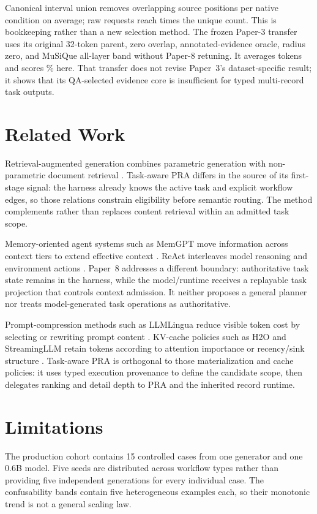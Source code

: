 \documentclass[10pt]{article}
\begin{document}
Canonical interval union removes \NativeBugMeanOverlapRemoved{} overlapping source positions per native condition on average; raw requests reach \NativeBugMaxDuplicationRatio{} times the unique count. This is bookkeeping rather than a new selection method. The frozen Paper-3 transfer uses its original 32-token parent, zero overlap, annotated-evidence oracle, radius zero, and MuSiQue all-layer band without Paper-8 retuning. It averages \NativeBugPaperThreeTokens{} tokens and scores \NativeBugPaperThreeAccuracy\% here. That transfer does not revise Paper~3's dataset-specific result; it shows that its QA-selected evidence core is insufficient for typed multi-record task outputs.

\section{Related Work}
Retrieval-augmented generation combines parametric generation with non-parametric document retrieval \cite{lewis2020rag}. Task-aware PRA differs in the source of its first-stage signal: the harness already knows the active task and explicit workflow edges, so those relations constrain eligibility before semantic routing. The method complements rather than replaces content retrieval within an admitted task scope.

Memory-oriented agent systems such as MemGPT move information across context tiers to extend effective context \cite{packer2023memgpt}. ReAct interleaves model reasoning and environment actions \cite{yao2023react}. Paper~8 addresses a different boundary: authoritative task state remains in the harness, while the model/runtime receives a replayable task projection that controls context admission. It neither proposes a general planner nor treats model-generated task operations as authoritative.

Prompt-compression methods such as LLMLingua reduce visible token cost by selecting or rewriting prompt content \cite{jiang2023llmlingua}. KV-cache policies such as H2O and StreamingLLM retain tokens according to attention importance or recency/sink structure \cite{zhang2023h2o,xiao2024streamingllm}. Task-aware PRA is orthogonal to those materialization and cache policies: it uses typed execution provenance to define the candidate scope, then delegates ranking and detail depth to PRA and the inherited record runtime.

\section{Limitations}
The production cohort contains 15 controlled cases from one generator and one 0.6B model. Five seeds are distributed across workflow types rather than providing five independent generations for every individual case. The confusability bands contain five heterogeneous examples each, so their monotonic trend is not a general scaling law.
\end{document}

